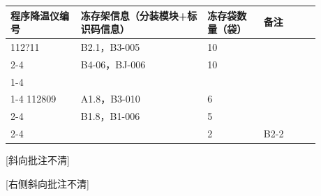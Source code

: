 \documentclass[UTF8,10pt,a4paper,fontset=fandol]{ctexart}
\newcommand{\fieldvalue}[1]{#1}
\newcommand{\handwritten}[1]{#1}
\begin{document}
\begin{center}
\small
\begin{tabular}{|p{0.20\linewidth}|p{0.36\linewidth}|p{0.16\linewidth}|p{0.16\linewidth}|}
\hline
程序降温仪编号 &
冻存架信息（分装模块+标识码信息） &
冻存袋数量（袋） &
备注 \\
\hline
\fieldvalue{\handwritten{112?11}}
&
\fieldvalue{\handwritten{B2.1，B3-005}}
&
\fieldvalue{\handwritten{10}}
&
\\
\cline{2-4}
&
\fieldvalue{\handwritten{B4-06，BJ-006}}
&
\fieldvalue{\handwritten{10}}
&
\\
\cline{1-4}
&
&
&
\\
\cline{1-4}
\fieldvalue{\handwritten{112809}}
&
\fieldvalue{\handwritten{A1.8，B3-010}}
&
\fieldvalue{\handwritten{6}}
&
\\
\cline{2-4}
&
\fieldvalue{\handwritten{B1.8，B1-006}}
&
\fieldvalue{\handwritten{5}}
&
\\
\cline{2-4}
&
&
\fieldvalue{\handwritten{2}}
&
\fieldvalue{\handwritten{B2-2}}
\\
\hline
\end{tabular}
\end{center}

\noindent
\handwritten{[斜向批注不清]}

\hspace{3em}
\handwritten{[右侧斜向批注不清]}
\end{document}
